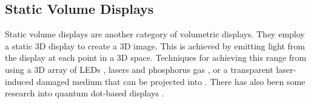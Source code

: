 \begin{invisBox}
  
  \hfill
\end{invisBox}

\subsection{Static Volume Displays}
Static volume displays are another category of volumetric displays. They employ a static 3D display to create a 3D image. This is achieved by emitting light from the display at each point in a 3D space. Techniques for achieving this range from using a 3D array of LEDs \cite{10.1145/2341931.2341937}, lasers and phosphorus gas \cite{https://doi.org/10.1002/anie.202003160}, or a transparent laser-induced damaged medium that can be projected into \cite{10.1145/1179849.1179982}. There has also been some research into quantum dot-based displays \cite{Hirayama2015}.

